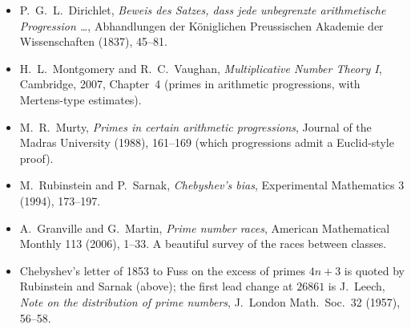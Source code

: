 \begin{itemize}
\item P.~G.~L.~Dirichlet, \emph{Beweis des Satzes, dass jede unbegrenzte arithmetische Progression \dots}, Abhandlungen der Königlichen
Preussischen Akademie der Wissenschaften (1837), 45--81.
\item H.~L.~Montgomery and R.~C.~Vaughan, \emph{Multiplicative Number Theory I}, Cambridge, 2007, Chapter~4 (primes in arithmetic
progressions, with Mertens-type estimates).
\item M.~R.~Murty, \emph{Primes in certain arithmetic progressions}, Journal of the Madras University (1988), 161--169 (which progressions admit
a Euclid-style proof).
\item M.~Rubinstein and P.~Sarnak, \emph{Chebyshev's bias}, Experimental Mathematics 3 (1994), 173--197.
\item A.~Granville and G.~Martin, \emph{Prime number races}, American Mathematical Monthly 113 (2006), 1--33. A beautiful survey of the races
between classes.
\item Chebyshev's letter of 1853 to Fuss on the excess of primes $4n+3$ is quoted by Rubinstein and Sarnak (above); the first lead change at $26861$ is J.~Leech, \emph{Note on the distribution of prime numbers}, J.\ London Math.\ Soc.\ 32 (1957), 56--58.
\end{itemize}
